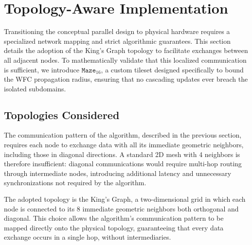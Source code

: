 \section{Topology-Aware Implementation}

Transitioning the conceptual parallel design to physical hardware requires a specialized network mapping and strict algorithmic guarantees. This section details the adoption of the King's Graph topology to facilitate exchanges between all adjacent nodes. To mathematically validate that this localized communication is sufficient, we introduce $\texttt{Maze}_{16}$, a custom tileset designed specifically to bound the WFC propagation radius, ensuring that no cascading updates ever breach the isolated subdomains.

\subsection{Topologies Considered}
The communication pattern of the algorithm, described in the previous section,
requires each node to exchange data with all its immediate geometric neighbors,
including those in diagonal directions. A standard 2D mesh with 4 neighbors is
therefore insufficient: diagonal communications would require multi-hop routing
through intermediate nodes, introducing additional latency and unnecessary
synchronizations not required by the algorithm.

The adopted topology is the King's Graph, a two-dimensional grid in
which each node is connected to its 8 immediate geometric neighbors both
orthogonal and diagonal. This choice allows the algorithm's communication pattern
to be mapped directly onto the physical topology, guaranteeing that every data
exchange occurs in a single hop, without intermediaries.

